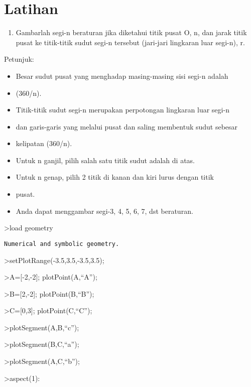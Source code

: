 \documentclass[
]{book}
\providecommand{\tightlist}{%
  \setlength{\itemsep}{0pt}\setlength{\parskip}{0pt}}
\begin{document}
\chapter{Latihan}\label{latihan-1}

\begin{enumerate}
\def\labelenumi{\arabic{enumi}.}
\tightlist
\item
  Gambarlah segi-n beraturan jika diketahui titik pusat O, n, dan jarak titik pusat ke titik-titik sudut segi-n tersebut (jari-jari lingkaran luar segi-n), r.
\end{enumerate}

Petunjuk:

\begin{itemize}
\item
  Besar sudut pusat yang menghadap masing-masing sisi segi-n adalah
\item
  (360/n).
\item
  Titik-titik sudut segi-n merupakan perpotongan lingkaran luar segi-n
\item
  dan garis-garis yang melalui pusat dan saling membentuk sudut sebesar
\item
  kelipatan (360/n).
\item
  Untuk n ganjil, pilih salah satu titik sudut adalah di atas.
\item
  Untuk n genap, pilih 2 titik di kanan dan kiri lurus dengan titik
\item
  pusat.
\item
  Anda dapat menggambar segi-3, 4, 5, 6, 7, dst beraturan.
\end{itemize}

\textgreater load geometry

\begin{verbatim}
Numerical and symbolic geometry.
\end{verbatim}

\textgreater setPlotRange(-3.5,3.5,-3.5,3.5);

\textgreater A={[}-2,-2{]}; plotPoint(A,``A'');

\textgreater B={[}2,-2{]}; plotPoint(B,``B'');

\textgreater C={[}0,3{]}; plotPoint(C,``C'');

\textgreater plotSegment(A,B,``c'');

\textgreater plotSegment(B,C,``a'');

\textgreater plotSegment(A,C,``b'');

\textgreater aspect(1):
\end{document}

